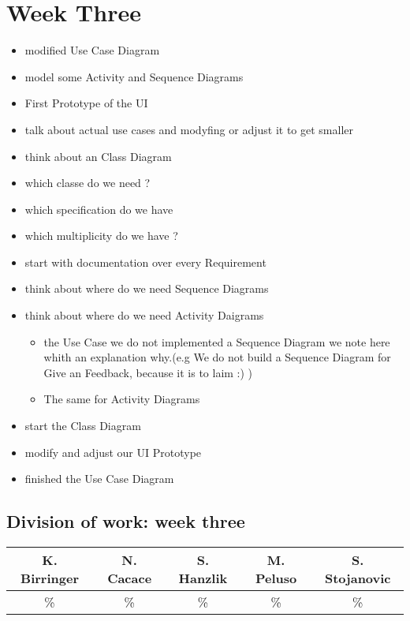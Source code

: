 \documentclass[a4paper, 12pt]{article}
\begin{document}
\section{Week Three}
\begin{itemize}
\item modified Use Case Diagram 
\item model some Activity and Sequence Diagrams 
\item First Prototype of the UI
\item talk about actual use cases and modyfing or adjust it to get smaller
\item think about an Class Diagram
\item which classe do we need ?
\item which specification do we have 
\item which multiplicity do we have ?
\item start with documentation over every Requirement
\item think about where do we need Sequence Diagrams 
\item think about where do we need Activity Daigrams
	\begin{itemize}
		\item the Use Case we do not implemented a Sequence Diagram we note here whith an explanation why.(e.g We do not build a Sequence Diagram for Give an Feedback, because it is to laim :) ) 
		\item The same for Activity Diagrams
	\end{itemize}
\item start the Class Diagram 
\item modify and adjust our UI Prototype
\item finished the Use Case Diagram
\end{itemize}

\subsection{Division of work: week three}

\begin{table}[h]
\centering
\setlength{\tabcolsep}{12pt}
\begin{tabular}{|c|c|c|c|c|}
\hline
K. Birringer & N. Cacace & S. Hanzlik & M. Peluso & S. Stojanovic\\
\hline
\% & \% & \% & \% & \% \\ 
\hline
\end{tabular}
\end{table}
\end{document}
